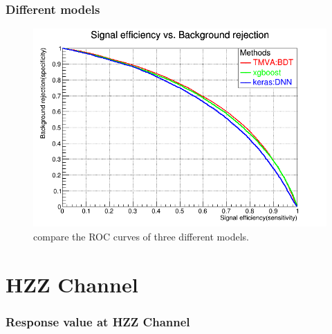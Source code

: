 \documentclass{beamer}
\begin{document}
\begin{frame}
\frametitle{Different models}
\begin{figure}
\includegraphics[scale=0.25]{./figures/tmva_xgboost.png}
\caption{compare the ROC curves of three different models.}
\end{figure}
\end{frame}

\section{HZZ Channel }
\begin{frame}
\frametitle{Response value at HZZ Channel}
\begin{figure}[H]
\centering
{} 
\end{figure}
\end{frame}
\end{document}
